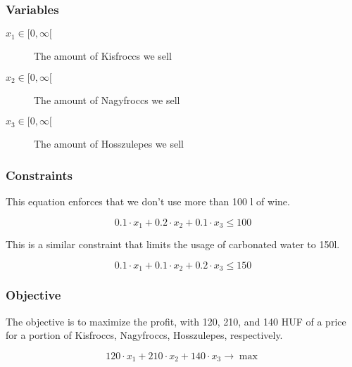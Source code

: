 \documentclass{article}
\begin{document}
    \subsubsection*{Variables}

    \begin{description}
        \item[$x_1\in[0,\infty[$] The amount of Kisfroccs we sell
        \item[$x_2\in[0,\infty[$] The amount of Nagyfroccs we sell
        \item[$x_3\in[0,\infty[$] The amount of Hosszulepes we sell 
    \end{description}

    \subsubsection*{Constraints}

    This equation enforces that we don't use more than 100 l of wine.

    $$ 0.1 \cdot x_1 + 0.2 \cdot x_2 + 0.1 \cdot x_3 \le 100 $$

    This is a similar constraint that limits the usage of carbonated water to 150l.

    $$ 0.1 \cdot x_1 + 0.1 \cdot x_2 + 0.2 \cdot x_3 \le 150 $$

    \subsubsection*{Objective}

    The objective is to maximize the profit, with 120, 210, and 140 HUF of a price for a portion of Kisfroccs, Nagyfroccs, Hosszulepes, respectively.

    $$ 120\cdot x_1 + 210\cdot x_2 + 140\cdot x_3 \to \max $$
\end{document}
